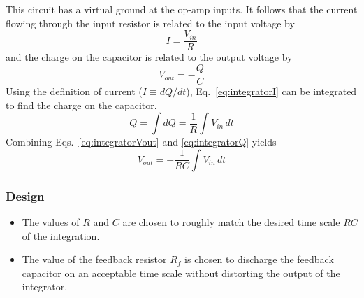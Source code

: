 \documentclass[11pt]{article}
\begin{document}
This circuit has a virtual ground at the op-amp inputs. It follows
that the current flowing through the input resistor is related to the
input voltage by
\begin{equation}
  \label{eq:integratorI}
  I = \frac{V_{in}}{R}
\end{equation}
and the charge on the capacitor is related to the output voltage by 
\begin{equation}
  \label{eq:integratorVout}
  V_{out} = -\frac{Q}{C}
\end{equation}
Using the definition of current ($I \equiv dQ/dt$),
Eq.~\ref{eq:integratorI} can be integrated to find the charge on the
capacitor.
\begin{equation}
  \label{eq:integratorQ}
  Q = \int dQ = \frac{1}{R} \int V_{in} \, dt
\end{equation}
Combining Eqs.~\ref{eq:integratorVout} and \ref{eq:integratorQ} yields 
\begin{equation}
  \label{eq:opampint}
  V_{out} = - \frac{1}{RC} \int V_{in} \, dt
\end{equation}

\subsubsection*{Design}
\begin{itemize}
\item The values of $R$ and $C$ are chosen to roughly match the
  desired time scale $RC$ of the integration. 

\item The value of the feedback resistor $R_f$ is chosen to discharge
  the feedback capacitor on an acceptable time scale without distorting
  the output of the integrator.
  
\end{itemize}


\end{document}
